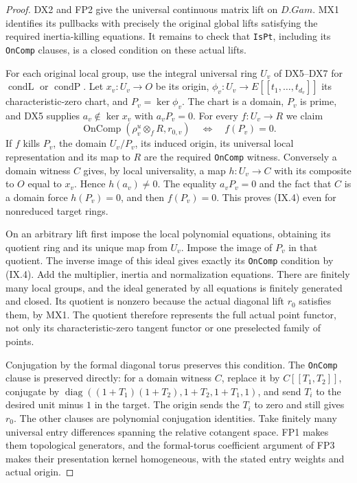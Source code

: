 \begin{proof}
DX2 and FP2 give the universal continuous matrix lift on
$D.Gam$.  MX1 identifies its pullbacks with precisely the
original global lifts satisfying the required inertia-killing
equations.  It remains to check that \texttt{IsPt}, including
its \texttt{OnComp} clauses, is a closed condition on these
actual lifts.

For each original local group, use the integral universal
ring $U_v$ of DX5--DX7 for $\operatorname{condL}$ or
$\operatorname{condP}$.  Let $x_v:U_v\to O$ be its origin,
$\phi_v:U_v\to E[[t_1,\ldots,t_{d_v}]]$ its
characteristic-zero chart, and $P_v=\ker\phi_v$.
The chart is a domain, $P_v$ is prime, and DX5 supplies
$a_v\notin\ker x_v$ with $a_vP_v=0$.
For every $f:U_v\to R$ we claim
\[
 \operatorname{OnComp}(\rho^u_v\otimes_fR,r_{0,v})
                  \quad\Longleftrightarrow\quad f(P_v)=0.
 \tag{IX.4}
\]
If $f$ kills $P_v$, the domain $U_v/P_v$, its induced origin,
its universal local representation and its map to $R$ are the
required \texttt{OnComp} witness.  Conversely a domain witness
$C$ gives, by local universality, a map $h:U_v\to C$ with
its composite to $O$ equal to $x_v$.  Hence $h(a_v)\ne0$.
The equality $a_vP_v=0$ and the fact that $C$ is a domain
force $h(P_v)=0$, and then $f(P_v)=0$.
This proves (IX.4) even for nonreduced target rings.

On an arbitrary lift first impose the local polynomial
equations, obtaining its quotient ring and its unique map
from $U_v$.  Impose the image of $P_v$ in that quotient.
The inverse image of this ideal gives exactly its
\texttt{OnComp} condition by (IX.4).  Add the multiplier,
inertia and normalization equations.  There are finitely
many local groups, and the ideal generated by all equations
is finitely generated and closed.  Its quotient is nonzero
because the actual diagonal lift $r_0$ satisfies them, by
MX1.  The quotient therefore represents the full actual
point functor, not only its characteristic-zero tangent
functor or one preselected family of points.

Conjugation by the formal diagonal torus preserves this
condition.  The \texttt{OnComp} clause is preserved directly:
for a domain witness $C$, replace it by
$C[[T_1,T_2]]$, conjugate by
$\operatorname{diag}((1+T_1)(1+T_2),1+T_2,1+T_1,1)$,
and send $T_i$ to the desired unit minus $1$ in the target.
The origin sends the $T_i$ to zero and still gives $r_0$.
The other clauses are polynomial conjugation identities.
Take finitely many universal entry differences spanning the
relative cotangent space.  FP1 makes them topological
generators, and the formal-torus coefficient argument of FP3
makes their presentation kernel homogeneous, with the stated
entry weights and actual origin.


\end{proof}
